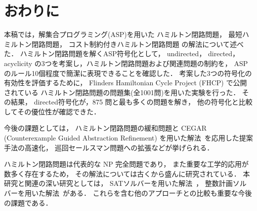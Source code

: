 ﻿%
\section{おわりに}\label{chap:conclusion}

本稿では，解集合プログラミング(ASP)を用いた
ハミルトン閉路問題，
最短ハミルトン閉路問題，
コスト制約付きハミルトン閉路問題
の解法について述べた．
%
ハミルトン閉路問題を解くASP符号化として，
\textsf{undirected}，
\textsf{directed}，
\textsf{acyclicity}
の3つを考案し，ハミルトン閉路問題および関連問題の制約を，
ASPのルール10個程度で簡潔に表現できることを確認した．
%
考案した3つの符号化の有効性を評価するために，
Flinders Hamiltonian Cycle Project (FHCP) で公開されている
ハミルトン閉路問題の問題集(全1001問)を用いた実験を行った．
その結果，
\textsf{directed}符号化が，875 問と最も多くの問題を解き，
他の符号化と比較してその優位性が確認できた．

今後の課題としては，
ハミルトン閉路問題の緩和問題と
CEGAR (Counterexample Guided Abstraction Refinement)
を用いた解法~\cite{soh14:jelia2014,soh20:cegar}を応用した提案手法の高速化，
巡回セールスマン問題への拡張などが挙げられる．

ハミルトン閉路問題は代表的な NP 完全問題であり，
また重要な工学的応用が数多く存在するため，
その解法については古くから盛んに研究されている．
本研究と関連の深い研究としては，
SATソルバーを用いた解法~\cite{Prestwich03:DAM,VelevG09:relative,soh14:jelia2014}，
整数計画ソルバーを用いた解法~\cite{numata11:tsp}がある．
これらを含む他のアプローチとの比較も重要な今後の課題である．


